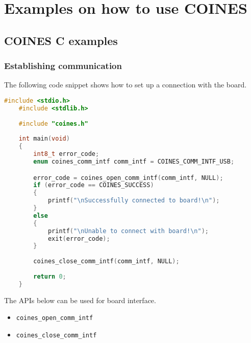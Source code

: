 \documentclass{article}
\begin{document}
\section{Examples on how to use COINES}
\subsection{COINES C examples}
\subsubsection{Establishing communication}
The following code snippet shows how to set up a connection with the board.
\begin{lstlisting}[language=c]
	#include <stdio.h>
	#include <stdlib.h>
	
	#include "coines.h"
	
	int main(void)
	{
		int8_t error_code;
		enum coines_comm_intf comm_intf = COINES_COMM_INTF_USB;

		error_code = coines_open_comm_intf(comm_intf, NULL);
		if (error_code == COINES_SUCCESS)
		{
			printf("\nSuccessfully connected to board!\n");
		}
		else
		{
			printf("\nUnable to connect with board!\n");
			exit(error_code);
		}
	
		coines_close_comm_intf(comm_intf, NULL);
	
		return 0;
	}

\end{lstlisting}
The APIs below can be used for board interface.
\begin{itemize}
	\item \texttt{coines\_open\_comm\_intf}
	\item \texttt{coines\_close\_comm\_intf}
\end{itemize}
\end{document}
